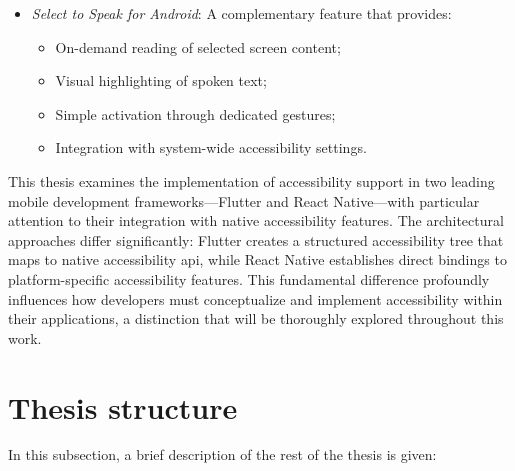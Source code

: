 \begin{itemize}
    \item \textit{Select to Speak for Android}: A complementary feature that provides:
        \begin{itemize}
            \item On-demand reading of selected screen content;
            \item Visual highlighting of spoken text;
            \item Simple activation through dedicated gestures;
            \item Integration with system-wide accessibility settings.
        \end{itemize}
\end{itemize}

This thesis examines the implementation of accessibility support in two leading mobile development frameworks—Flutter and React Native—with particular attention to their integration with native accessibility features. The architectural approaches differ significantly: Flutter creates a structured accessibility tree that maps to native accessibility \acrshort{api}, while React Native establishes direct bindings to platform-specific accessibility features. This fundamental difference profoundly influences how developers must conceptualize and implement accessibility within their applications, a distinction that will be thoroughly explored throughout this work.

\section{Thesis structure}
\label{chap:intro-structure} 

In this subsection, a brief description of the rest of the thesis is given:

